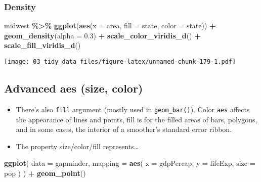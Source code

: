 \documentclass[
]{book}
\newenvironment{Shaded}{\begin{snugshade}}{\end{snugshade}}
\newcommand{\DataTypeTok}[1]{\textcolor[rgb]{0.13,0.29,0.53}{#1}}
\newcommand{\FloatTok}[1]{\textcolor[rgb]{0.00,0.00,0.81}{#1}}
\newcommand{\KeywordTok}[1]{\textcolor[rgb]{0.13,0.29,0.53}{\textbf{#1}}}
\newcommand{\NormalTok}[1]{#1}
\newcommand{\OperatorTok}[1]{\textcolor[rgb]{0.81,0.36,0.00}{\textbf{#1}}}
\newcommand{\StringTok}[1]{\textcolor[rgb]{0.31,0.60,0.02}{#1}}
\begin{document}
\hypertarget{density}{%
\subsubsection{Density}\label{density}}

\begin{Shaded}
\begin{Highlighting}[]
\NormalTok{midwest }\OperatorTok{\%\textgreater{}\%}
\StringTok{  }\KeywordTok{ggplot}\NormalTok{(}\KeywordTok{aes}\NormalTok{(}\DataTypeTok{x =}\NormalTok{ area, }\DataTypeTok{fill =}\NormalTok{ state, }\DataTypeTok{color =}\NormalTok{ state)) }\OperatorTok{+}
\StringTok{  }\KeywordTok{geom\_density}\NormalTok{(}\DataTypeTok{alpha =} \FloatTok{0.3}\NormalTok{) }\OperatorTok{+}
\StringTok{  }\KeywordTok{scale\_color\_viridis\_d}\NormalTok{() }\OperatorTok{+}
\StringTok{  }\KeywordTok{scale\_fill\_viridis\_d}\NormalTok{()}
\end{Highlighting}
\end{Shaded}

\texttt{[image: 03\_tidy\_data\_files/figure-latex/unnamed-chunk-179-1.pdf]}

\hypertarget{advanced-aes-size-color}{%
\subsection{Advanced aes (size, color)}\label{advanced-aes-size-color}}

\begin{itemize}
\item
  There's also \texttt{fill} argument (mostly used in \texttt{geom\_bar()}). Color \texttt{aes} affects the appearance of lines and points, fill is for the filled areas of bars, polygons, and in some cases, the interior of a smoother's standard error ribbon.
\item
  The property size/color/fill represents\ldots{}
\end{itemize}

\begin{Shaded}
\begin{Highlighting}[]
\KeywordTok{ggplot}\NormalTok{(}
  \DataTypeTok{data =}\NormalTok{ gapminder,}
  \DataTypeTok{mapping =} \KeywordTok{aes}\NormalTok{(}
    \DataTypeTok{x =}\NormalTok{ gdpPercap, }\DataTypeTok{y =}\NormalTok{ lifeExp,}
    \DataTypeTok{size =}\NormalTok{ pop}
\NormalTok{  )}
\NormalTok{) }\OperatorTok{+}
\StringTok{  }\KeywordTok{geom\_point}\NormalTok{()}
\end{Highlighting}
\end{Shaded}
\end{document}
